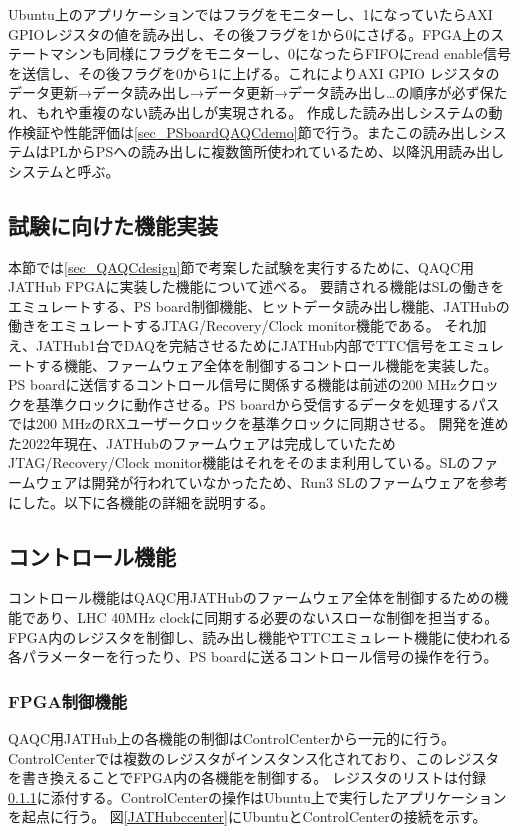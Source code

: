 Ubuntu上のアプリケーションではフラグをモニターし、1になっていたらAXI GPIOレジスタの値を読み出し、その後フラグを1から0にさげる。FPGA上のステートマシンも同様にフラグをモニターし、0になったらFIFOにread enable信号を送信し、その後フラグを0から1に上げる。これによりAXI GPIO レジスタのデータ更新→データ読み出し→データ更新→データ読み出し…の順序が必ず保たれ、もれや重複のない読み出しが実現される。
作成した読み出しシステムの動作検証や性能評価は\ref{sec_PSboardQAQCdemo}節で行う。またこの読み出しシステムはPLからPSへの読み出しに複数箇所使われているため、以降汎用読み出しシステムと呼ぶ。


\subsection{試験に向けた機能実装}
\label{subsec_function}
本節では\ref{sec_QAQCdesign}節で考案した試験を実行するために、QAQC用JATHub FPGAに実装した機能について述べる。
要請される機能はSLの働きをエミュレートする、PS board制御機能、ヒットデータ読み出し機能、JATHubの働きをエミュレートするJTAG/Recovery/Clock monitor機能である。
それ加え、JATHub1台でDAQを完結させるためにJATHub内部でTTC信号をエミュレートする機能、ファームウェア全体を制御するコントロール機能を実装した。
PS boardに送信するコントロール信号に関係する機能は前述の200 MHzクロックを基準クロックに動作させる。PS boardから受信するデータを処理するパスでは200 MHzのRXユーザークロックを基準クロックに同期させる。
開発を進めた2022年現在、JATHubのファームウェアは完成していたためJTAG/Recovery/Clock monitor機能はそれをそのまま利用している。SLのファームウェアは開発が行われていなかったため、Run3 SLのファームウェアを参考にした。以下に各機能の詳細を説明する。

\subsection*{\textbf{コントロール機能}}
\label{subsubsec_control}
コントロール機能はQAQC用JATHubのファームウェア全体を制御するための機能であり、LHC 40MHz clockに同期する必要のないスローな制御を担当する。FPGA内のレジスタを制御し、読み出し機能やTTCエミュレート機能に使われる各パラメーターを行ったり、PS boardに送るコントロール信号の操作を行う。

\subsubsection{FPGA制御機能}
QAQC用JATHub上の各機能の制御はControlCenterから一元的に行う。
ControlCenterでは複数のレジスタがインスタンス化されており、このレジスタを書き換えることでFPGA内の各機能を制御する。
レジスタのリストは付録\ref{}に添付する。ControlCenterの操作はUbuntu上で実行したアプリケーションを起点に行う。
図\ref{JATHubccenter}にUbuntuとControlCenterの接続を示す。

